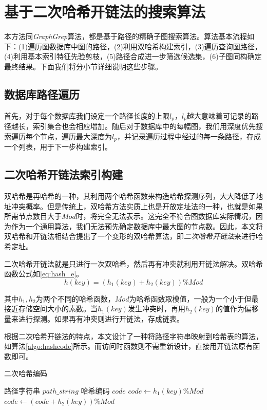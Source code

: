 \documentclass{XDBAthesis}
\numberwithin{algorithm}{chapter}
\begin{document}
\section{基于二次哈希开链法的搜索算法}
本方法同\emph{GraphGrep}算法\cite{graphgrep}，都是基于路径的精确子图搜索算法。算法基本流程如下：(1)遍历图数据库中图的路径，(2)利用双哈希构建索引，(3)遍历查询图路径，(4)利用基本索引特征先验剪枝，(5)路径合成进一步筛选候选集，(6)子图同构确定最终结果。下面我们将分小节详细说明这些步骤。
\subsection{数据库路径遍历}
首先，对于每个数据库我们设定一个路径长度的上限$l_p $，$l_p $越大意味着可记录的路径越长，索引集合也会相应增加。随后对于数据库中的每幅图，我们用深度优先搜索遍历每个节点，遍历最大深度为$l_p $，并记录遍历过程中经过的每一条路径，存成一个列表，用于下一步构建索引。
\subsection{二次哈希开链法索引构建}
双哈希是再哈希的一种，其利用两个哈希函数来构造哈希探测序列，大大降低了地址冲突概率。但是传统上，双哈希方法实质上也是开放定址法的一种，也就是如果所需节点数目大于$Mod$时，将完全无法表示。这完全不符合图数据库实际情况，因为作为一个通用算法，我们无法预先确定数据库中最大图的节点数。因此，本文将双哈希和开链法相结合提出了一个变形的双哈希算法，即\emph{二次哈希开链法}来进行哈希定址。

二次哈希开链法就是只进行一次双哈希，然后再有冲突就利用开链法解决。双哈希函数公式如\eqref{eq:hash_e}。
\begin{equation}
    h(key)=(h_1 (key)+ h_2 (key))\%Mod
    \label{eq:hash_e}
\end{equation}

其中$h_1 ,h_2 $为两个不同的哈希函数，$Mod$为哈希函数取模值，一般为一个小于但最接近存储空间大小的素数。当$h_1 (key)$发生冲突时，再用$h_2 (key)$的值作为偏移量来进行探测。如果再有冲突则进行开链法，存成链表。

根据二次哈希开链法的特点，本文设计了一种将路径字符串映射到哈希表的算法，如算法\ref{algo:hashcode}所示。而访问时函数则不需重新设计，直接用开链法原有函数即可。

\begin{algorithm}
\caption{二次哈希编码}
\label{algo:hashcode}
\begin{algorithmic}[1]
    \Require 路径字符串 $path\_string$
    \Ensure 哈希编码 $code$
        \State $code \gets h_1 (key)\%Mod$
            \State $code \gets (code+h_2 (key))\%Mod$
        \EndIf
        \State {}
    \EndFunction     
\end{algorithmic}
\end{algorithm}
\end{document}
